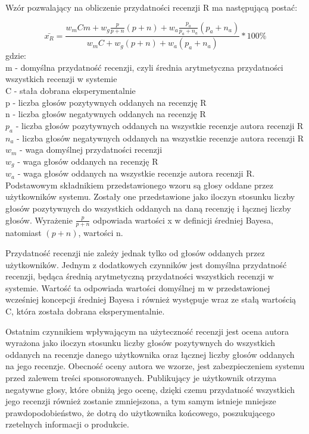 Wzór pozwalający na obliczenie przydatności recenzji R ma następującą postać:

\begin{equation}
\bar{x_{R}}=\frac{w_{m}Cm+w_{g}\frac{p}{p+n}(p+n)+w_{a}\frac{p_{a}}{p_{a}+n_{a}}(p_{a}+n_{a})}{w_{m}C+w_{g}(p+n)+w_{a}(p_{a}+n_{a})}*100\%
\end{equation}
gdzie:\\
m - domyślna przydatność recenzji, czyli średnia arytmetyczna przydatności wszystkich recenzji w systemie\\
C - stała dobrana eksperymentalnie\\
p - liczba głosów pozytywnych oddanych na recenzję R\\
n - liczba głosów negatywnych oddanych na recenzję R\\
$p_{a}$ - liczba głosów pozytywnych oddanych na wszystkie recenzje autora recenzji R\\
$n_{a}$ - liczba głosów negatywnych oddanych na wszystkie recenzje autora recenzji R\\
$w_{m}$ - waga domyślnej przydatności recenzji\\
$w_{g}$ - waga głosów oddanych na recenzję R\\
$w_{a}$ - waga głosów oddanych na wszystkie recenzje autora recenzji R.\\


Podstawowym składnikiem przedstawionego wzoru są głosy oddane przez użytkowników systemu. Zostały one przedstawione jako iloczyn stosunku liczby głosów pozytywnych do wszystkich oddanych na daną recenzję i łącznej liczby głosów. Wyrażenie $\frac{p}{p+n}$ odpowiada wartości x w definicji średniej Bayesa, natomiast $(p + n)$, wartości n.

Przydatność recenzji nie zależy jednak tylko od głosów oddanych przez użytkowników. Jednym z dodatkowych czynników jest domyślna przydatność recenzji, będąca średnią arytmetyczną przydatności wszystkich recenzji w systemie. Wartość ta odpowiada wartości domyślnej m w przedstawionej wcześniej koncepcji średniej Bayesa i również występuje wraz ze stałą wartością C, która została dobrana eksperymentalnie.

Ostatnim czynnikiem wpływającym na użyteczność recenzji jest ocena autora wyrażona jako iloczyn stosunku liczby głosów pozytywnych do wszystkich oddanych na recenzje danego użytkownika oraz łącznej liczby głosów oddanych na jego recenzje. Obecność oceny autora we wzorze, jest zabezpieczeniem systemu przed zalewem treści sponsorowanych. Publikujący je użytkownik otrzyma negatywne głosy, które obniżą jego ocenę, dzięki czemu przydatność wszystkich jego recenzji również zostanie zmniejszona, a tym samym istnieje mniejsze prawdopodobieństwo, że dotrą do użytkownika końcowego, poszukującego rzetelnych informacji o produkcie. 

